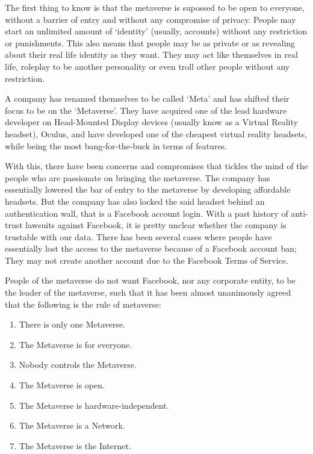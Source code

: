 \documentclass[
  11pt, %
]{assignment}
\begin{document}
The first thing to know is that the metaverse is supossed to be open to everyone, without a barrier of entry and without any compromise of privacy. People may start an unlimited amount of `identity' (usually, accounts) without any restriction or punishments. This also means that people may be as private or as revealing about their real life identity as they want. They may act like themselves in real life, roleplay to be another personality or even troll other people without any restriction.

A company has renamed themselves to be called `Meta' and has shifted their focus to be on the `Metaverse'. They have acquired one of the lead hardware developer on Head-Mounted Display devices (usually know as a Virtual Reality headset), Oculus, and have developed one of the cheapest virtual reality headsets, while being the most bang-for-the-buck in terms of features.

With this, there have been concerns and compromises that tickles the mind of the people who are passionate on bringing the metaverse. The company has essentially lowered the bar of entry to the metaverse by developing affordable headsets. But the company has also locked the said headset behind an authentication wall, that is a Facebook account login. With a past history of anti-trust lawsuits against Facebook, it is pretty unclear whether the company is trustable with our data. There has been several cases where people have essentially lost the access to the metaverse because of a Facebook account ban; They may not create another account due to the Facebook Terms of Service.

People of the metaverse do not want Facebook, nor any corporate entity, to be the leader of the metaverse, such that it has been almost unanimously agreed that the following is the rule of metaverse:
\begin{enumerate}
  \item There is only one Metaverse.
  \item The Metaverse is for everyone.
  \item Nobody controls the Metaverse.
  \item The Metaverse is open.
  \item The Metaverse is hardware-independent.
  \item The Metaverse is a Network.
  \item The Metaverse is the Internet.
\end{enumerate}
\end{document}
